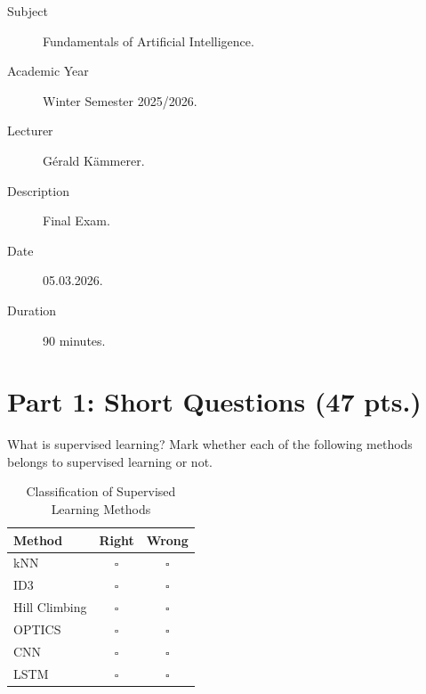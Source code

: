 \documentclass[12pt]{article}
\begin{document}
    

    \begin{description}
        \item[Subject] Fundamentals of Artificial Intelligence.
        \item[Academic Year] Winter Semester 2025/2026.
        \item[Lecturer] Gérald Kämmerer.
        \item[Description] Final Exam.
        \item[Date] 05.03.2026.
        \item[Duration] 90 minutes.
    \end{description}
    \newpage

    \section*{Part 1: Short Questions (47 pts.)}

    \begin{ejercicio}
        What is supervised learning? Mark whether each of the following methods belongs to supervised learning or not.

        \begin{table}[h!]
        \centering
        \begin{tabular}{lcc}
        \hline
        \textbf{Method} & \textbf{Right} & \textbf{Wrong} \\ \hline
        kNN & $\square$ & $\square$ \\
        ID3 & $\square$ & $\square$ \\
        Hill Climbing & $\square$ & $\square$ \\
        OPTICS & $\square$ & $\square$ \\
        CNN & $\square$ & $\square$ \\
        LSTM & $\square$ & $\square$ \\ \hline
        \end{tabular}
        \caption{Classification of Supervised Learning Methods}
        \end{table}
    \end{ejercicio}
\end{document}
